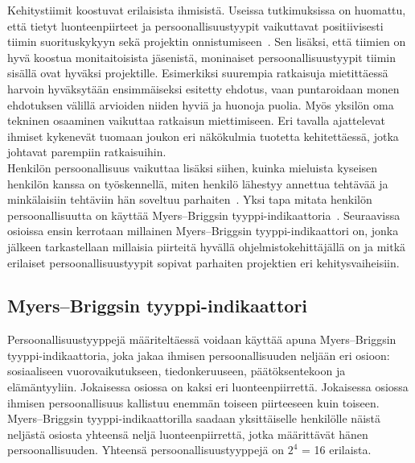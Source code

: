\documentclass[finnish]{../tktltiki2}
\theoremstyle{definition}
\theoremstyle{remark}
\begin{document}
Kehitystiimit koostuvat erilaisista ihmisistä. Useissa tutkimuksissa on huomattu, että tietyt
luonteenpiirteet ja persoonallisuustyypit vaikuttavat positiivisesti tiimin suorituskykyyn sekä
projektin onnistumiseen~\cite{Acuna:2008:ESP:1414004.1414056,Capretz:2003:PTS:766407.766410,Capretz:2010:MSS:1726559.1726574,Gorla:2004:WWB:990680.990684}. Sen lisäksi, että tiimien on hyvä koostua monitaitoisista
jäsenistä, moninaiset persoonallisuustyypit tiimin sisällä ovat hyväksi
projektille. Esimerkiksi suurempia ratkaisuja mietittäessä harvoin hyväksytään
ensimmäiseksi esitetty ehdotus, vaan puntaroidaan monen ehdotuksen
välillä arvioiden niiden hyviä ja huonoja puolia. Myös yksilön oma
tekninen osaaminen vaikuttaa ratkaisun miettimiseen. Eri tavalla ajattelevat ihmiset kykenevät tuomaan joukon
eri näkökulmia tuotetta kehitettäessä, jotka johtavat parempiin ratkaisuihin.\\

Henkilön persoonallisuus vaikuttaa lisäksi siihen,
kuinka mieluista kyseisen henkilön kanssa on työskennellä,
miten henkilö lähestyy annettua tehtävää ja minkälaisiin tehtäviin
hän soveltuu parhaiten~\cite{Begel:2008:PPW:1414004.1414026,Capretz:2010:MSS:1726559.1726574}. Yksi tapa mitata henkilön persoonallisuutta on käyttää Myers--Briggsin tyyppi-indikaattoria~\cite{Capretz:2003:PTS:766407.766410,Capretz:2010:MSS:1726559.1726574,DaCunha:2007:PMA:1230819.1241672}.
Seuraavissa osioissa ensin kerrotaan millainen Myers--Briggsin tyyppi-indikaattori on, jonka jälkeen tarkastellaan millaisia piirteitä hyvällä ohjelmistokehittäjällä on ja mitkä erilaiset persoonallisuustyypit sopivat parhaiten projektien eri kehitysvaiheisiin.

\subsection{Myers--Briggsin tyyppi-indikaattori}

Persoonallisuustyyppejä määriteltäessä voidaan käyttää apuna
Myers--Briggsin tyyppi-indikaattoria, joka jakaa ihmisen persoonallisuuden neljään eri osioon: sosiaaliseen vuorovaikutukseen, tiedonkeruuseen, päätöksentekoon ja elämän\-tyyliin. Jokaisessa osiossa on
kaksi eri luonteenpiirrettä. Jokaisessa osiossa ihmisen persoonallisuus kallistuu enemmän toiseen piirteeseen kuin toiseen. Myers--Briggsin
tyyppi-indikaattorilla saadaan yksittäiselle henkilölle näistä neljästä osiosta yhteensä neljä luonteenpiirrettä, jotka määrittävät hänen persoonallisuuden. Yhteensä
persoonallisuustyyppejä on $2^4$ = 16 erilaista.
\end{document}
